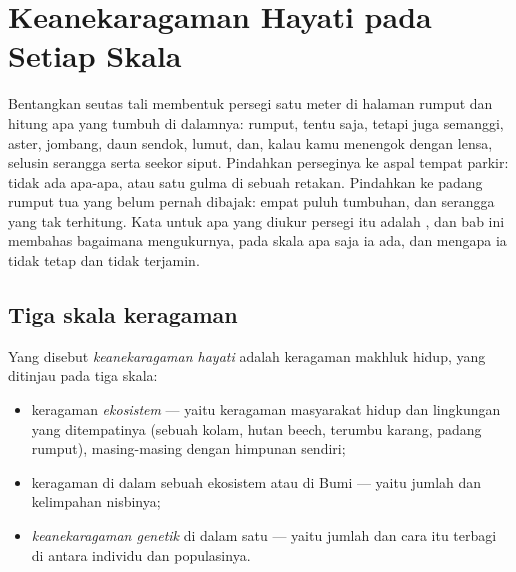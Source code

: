 \chapter{Keanekaragaman Hayati pada Setiap Skala}\label{ch:g10:biodiversity-scales}

Bentangkan seutas tali membentuk persegi satu meter di halaman rumput
dan hitung apa yang tumbuh di dalamnya: rumput, tentu saja, tetapi juga
semanggi, aster, jombang, daun sendok, lumut, dan, kalau kamu menengok
dengan lensa, selusin serangga serta seekor siput. Pindahkan perseginya
ke aspal tempat parkir: tidak ada apa-apa, atau satu gulma di sebuah
retakan. Pindahkan ke padang rumput tua yang belum pernah dibajak: empat
puluh  tumbuhan, dan serangga yang tak terhitung. Kata untuk apa
yang diukur persegi itu adalah \emph{}, dan bab ini
membahas bagaimana mengukurnya, pada skala apa saja ia ada, dan mengapa
ia tidak tetap dan tidak terjamin.

\section{Tiga skala keragaman}

\begin{definition}\label{def:g10:biodiversity-scales:biodiversity}
Yang disebut \emph{keanekaragaman hayati}
adalah keragaman makhluk hidup, yang ditinjau pada tiga skala:
\begin{itemize}
  \item keragaman \emph{ekosistem} --- yaitu keragaman
        masyarakat hidup dan lingkungan yang ditempatinya (sebuah
        kolam, hutan beech, terumbu karang, padang rumput),
        masing-masing dengan himpunan  sendiri;
  \item keragaman  di dalam sebuah ekosistem atau di Bumi ---
        yaitu jumlah  dan kelimpahan nisbinya;
  \item \emph{keanekaragaman genetik} di
        dalam satu  --- yaitu jumlah   dan cara 
        itu terbagi di antara individu dan populasinya.
\end{itemize}
\end{definition}

